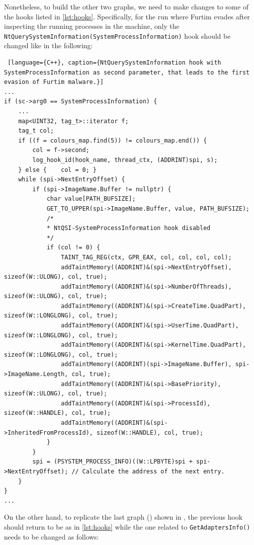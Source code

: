 \documentclass[LaM,binding=0.6cm]{sapthesis}
\begin{document}
Nonetheless, to build the other two graphs, we need to make changes to some of the hooks listed in \ref{lst:hooks}. Specifically, for the run where Furtim evades after inspecting the running processes in the machine, only the \texttt{NtQuerySystemInformati\-on(SystemProcessInformation)} hook should be changed like in the following:
\begin{lstlisting} [language={C++}, caption={NtQuerySystemInformation hook with SystemProcessInformation as second parameter, that leads to the first evasion of Furtim malware.}]
...
if (sc->arg0 == SystemProcessInformation) {
	...
	map<UINT32, tag_t>::iterator f;
	tag_t col;
	if ((f = colours_map.find(5)) != colours_map.end()) {
		col = f->second;
		log_hook_id(hook_name, thread_ctx, (ADDRINT)spi, s);
	} else {	col = 0; }
	while (spi->NextEntryOffset) {
		if (spi->ImageName.Buffer != nullptr) {	
			char value[PATH_BUFSIZE];
			GET_TO_UPPER(spi->ImageName.Buffer, value, PATH_BUFSIZE);
			/*
			* NtQSI-SystemProcessInformation hook disabled
			*/
			if (col != 0) {
				TAINT_TAG_REG(ctx, GPR_EAX, col, col, col, col);
				addTaintMemory((ADDRINT)&(spi->NextEntryOffset), sizeof(W::ULONG), col, true);
				addTaintMemory((ADDRINT)&(spi->NumberOfThreads), sizeof(W::ULONG), col, true);
				addTaintMemory((ADDRINT)&(spi->CreateTime.QuadPart), sizeof(W::LONGLONG), col, true);
				addTaintMemory((ADDRINT)&(spi->UserTime.QuadPart), sizeof(W::LONGLONG), col, true);
				addTaintMemory((ADDRINT)&(spi->KernelTime.QuadPart), sizeof(W::LONGLONG), col, true);
				addTaintMemory((ADDRINT)(spi->ImageName.Buffer), spi->ImageName.Length, col, true);
				addTaintMemory((ADDRINT)&(spi->BasePriority), sizeof(W::ULONG), col, true);
				addTaintMemory((ADDRINT)&(spi->ProcessId), sizeof(W::HANDLE), col, true);
				addTaintMemory((ADDRINT)&(spi->InheritedFromProcessId), sizeof(W::HANDLE), col, true);	
			}
		}
		spi = (PSYSTEM_PROCESS_INFO)((W::LPBYTE)spi + spi->NextEntryOffset); // Calculate the address of the next entry.
	}
}
...
\end{lstlisting}
On the other hand, to replicate the last graph () shown in , the previous hook should return to be as in \ref{lst:hooks} while the one related to \texttt{GetAdaptersInfo()} needs to be changed as follows:
\end{document}
